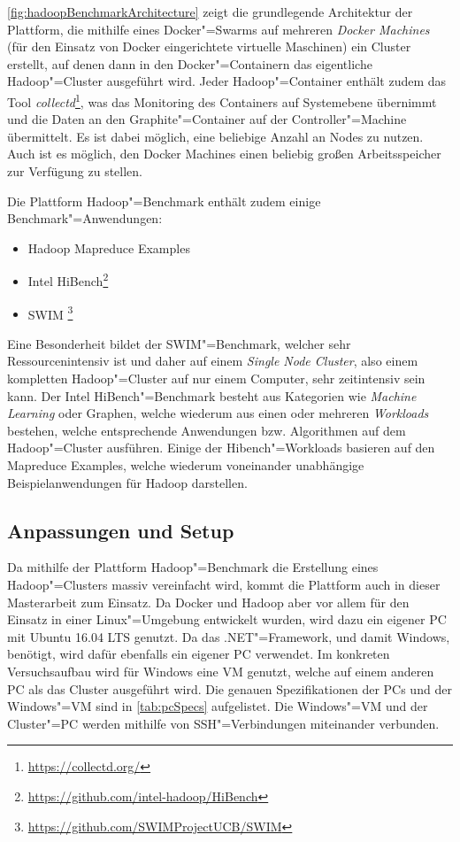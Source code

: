 \autoref{fig:hadoopBenchmarkArchitecture} zeigt die grundlegende Architektur der Plattform, die mithilfe eines Docker"=Swarms auf mehreren \emph{Docker Machines} (für den Einsatz von Docker eingerichtete virtuelle Maschinen) ein Cluster erstellt, auf denen dann in den Docker"=Containern das eigentliche Hadoop"=Cluster ausgeführt wird.
Jeder Hadoop"=Container enthält zudem das Tool \emph{collectd}\footnote{\url{https://collectd.org/}}, was das Monitoring des Containers auf Systemebene übernimmt und die Daten an den Graphite"=Container auf der Controller"=Machine übermittelt.
Es ist dabei möglich, eine beliebige Anzahl an Nodes zu nutzen.
Auch ist es möglich, den Docker Machines einen beliebig großen Arbeitsspeicher zur Verfügung zu stellen.

Die Plattform Hadoop"=Benchmark enthält zudem einige Benchmark"=Anwendungen:

\begin{itemize}
    \item Hadoop Mapreduce Examples
    \item Intel HiBench\footnote{\url{https://github.com/intel-hadoop/HiBench}}
    \item \ac{SWIM} \footnote{\url{https://github.com/SWIMProjectUCB/SWIM}}
\end{itemize}

Eine Besonderheit bildet der SWIM"=Benchmark, welcher sehr Ressourcenintensiv ist und daher auf einem \emph{Single Node Cluster}, also einem kompletten Hadoop"=Cluster auf nur einem Computer, sehr zeitintensiv sein kann.
Der Intel HiBench"=Benchmark besteht aus Kategorien wie \emph{Machine Learning} oder Graphen, welche wiederum aus einen oder mehreren \emph{Workloads} bestehen, welche entsprechende Anwendungen bzw. Algorithmen auf dem Hadoop"=Cluster ausführen.
Einige der Hibench"=Workloads basieren auf den Mapreduce Examples, welche wiederum voneinander unabhängige Beispielanwendungen für Hadoop darstellen.

\subsection{Anpassungen und Setup}\label{sec:clusterFallstudie}

Da mithilfe der Plattform Hadoop"=Benchmark die Erstellung eines Hadoop"=Clusters massiv vereinfacht wird, kommt die Plattform auch in dieser Masterarbeit zum Einsatz.
Da Docker und Hadoop aber vor allem für den Einsatz in einer Linux"=Umgebung entwickelt wurden, wird dazu ein eigener PC mit Ubuntu 16.04 LTS genutzt.
Da \sS das .NET"=Framework, und damit Windows, benötigt, wird dafür ebenfalls ein eigener PC verwendet.
Im konkreten Versuchsaufbau wird für Windows eine VM genutzt, welche auf einem anderen PC als das Cluster ausgeführt wird.
Die genauen Spezifikationen der PCs und der Windows"=VM sind in \autoref{tab:pcSpecs} aufgelistet.
Die Windows"=VM und der Cluster"=PC werden mithilfe von SSH"=Verbindungen miteinander verbunden.

